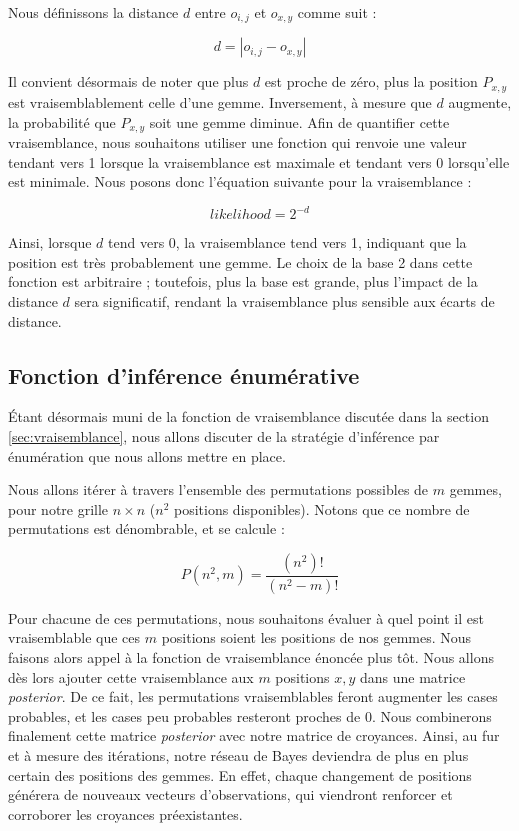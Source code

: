 \documentclass{article}
\begin{document}
\vspace{1em}

\noindent Nous définissons la distance \( d \) entre \( o_{i,j} \) et \( o_{x,y} \) comme suit :

\[
d = \left| o_{i,j} - o_{x,y} \right|
\]

\noindent Il convient désormais de noter que plus \( d \) est proche de zéro, plus la position \( P_{x,y} \) est vraisemblablement celle d'une gemme. Inversement, à mesure que \( d \) augmente, la probabilité que \( P_{x,y} \) soit une gemme diminue. Afin de quantifier cette vraisemblance, nous souhaitons utiliser une fonction qui renvoie une valeur tendant vers 1 lorsque la vraisemblance est maximale et tendant vers 0 lorsqu'elle est minimale. Nous posons donc l'équation suivante pour la vraisemblance :

\[
likelihood = 2^{-d}
\]

\vspace{1em}

\noindent Ainsi, lorsque \( d \) tend vers 0, la vraisemblance tend vers 1, indiquant que la position est très probablement une gemme. Le choix de la base 2 dans cette fonction est arbitraire ; toutefois, plus la base est grande, plus l'impact de la distance \( d \) sera significatif, rendant la vraisemblance plus sensible aux écarts de distance.

\subsection{Fonction d'inférence énumérative}

\noindent Étant désormais muni de la fonction de vraisemblance discutée dans la section \ref{sec:vraisemblance}, nous allons discuter de la stratégie d'inférence par énumération que nous allons mettre en place. 

\vspace{1em}

\noindent Nous allons itérer à travers l'ensemble des permutations possibles de \( m \) gemmes, pour notre grille \( n \times n \) (\( n^2 \) positions disponibles). Notons que ce nombre de permutations est dénombrable, et se calcule :

\[
P(n^2, m) = \frac{(n^2)!}{(n^2 - m)!}
\]

\vspace{1em}

\noindent Pour chacune de ces permutations, nous souhaitons évaluer à quel point il est vraisemblable que ces \( m \) positions soient les positions de nos gemmes. Nous faisons alors appel à la fonction de vraisemblance énoncée plus tôt. Nous allons dès lors ajouter cette vraisemblance aux \( m \) positions \( x, y \) dans une matrice \textit{posterior}. De ce fait, les permutations vraisemblables feront augmenter les cases probables, et les cases peu probables resteront proches de 0. Nous combinerons finalement cette matrice \textit{posterior} avec notre matrice de croyances. Ainsi, au fur et à mesure des itérations, notre réseau de Bayes deviendra de plus en plus certain des positions des gemmes. En effet, chaque changement de positions générera de nouveaux vecteurs d'observations, qui viendront renforcer et corroborer les croyances préexistantes.
\end{document}
